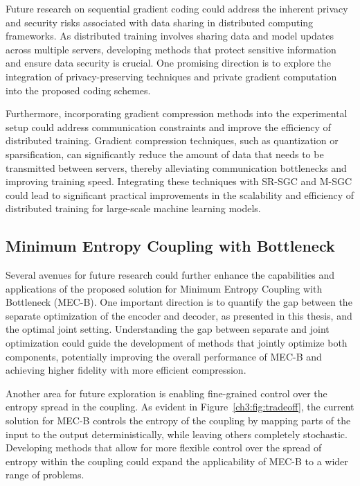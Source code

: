 Future research on sequential gradient coding could address the inherent privacy and security risks associated with data sharing in distributed computing frameworks. As distributed training involves sharing data and model updates across multiple servers, developing methods that protect sensitive information and ensure data security is crucial. One promising direction is to explore the integration of privacy-preserving techniques and private gradient computation into the proposed coding schemes.

Furthermore, incorporating gradient compression methods into the experimental setup could address communication constraints and improve the efficiency of distributed training. Gradient compression techniques, such as quantization or sparsification, can significantly reduce the amount of data that needs to be transmitted between servers, thereby alleviating communication bottlenecks and improving training speed. Integrating these techniques with SR-SGC and M-SGC could lead to significant practical improvements in the scalability and efficiency of distributed training for large-scale machine learning models.

\subsection{Minimum Entropy Coupling with Bottleneck}

Several avenues for future research could further enhance the capabilities and applications of the proposed solution for Minimum Entropy Coupling with Bottleneck (MEC-B). One important direction is to quantify the gap between the separate optimization of the encoder and decoder, as presented in this thesis, and the optimal joint setting.  Understanding the gap between separate and joint optimization could guide the development of methods that jointly optimize both components, potentially improving the overall performance of MEC-B and achieving higher fidelity with more efficient compression.

Another area for future exploration is enabling fine-grained control over the entropy spread in the coupling. As evident in Figure~\ref{ch3:fig:tradeoff}, the current solution for MEC-B controls the entropy of the coupling by mapping parts of the input to the output deterministically, while leaving others completely stochastic. Developing methods that allow for more flexible control over the spread of entropy within the coupling could expand the applicability of MEC-B to a wider range of problems.

